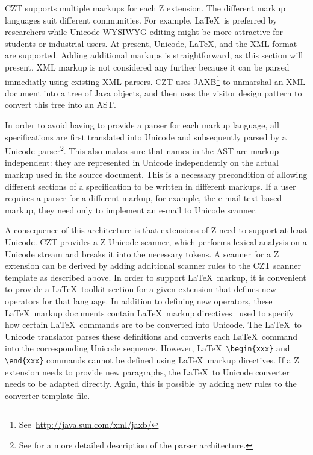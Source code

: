 \documentclass{llncs}
\begin{document}
 CZT supports multiple markups for each Z extension.  The different
 markup languages suit different communities.  For example, \LaTeX\ is
 preferred by researchers while Unicode WYSIWYG editing might be more
 attractive for students or industrial users. At present, Unicode,
 \LaTeX, and the XML format are supported.  Adding additional markups
 is straightforward, as this section will present.  XML markup is not
 considered any further because it can be parsed immediatly using
 existing XML parsers.  CZT uses
 JAXB\footnote{See~\url{http://java.sun.com/xml/jaxb/}} to unmarshal an
 XML document into a tree of Java objects, and then uses the visitor
 design pattern to convert this tree into an AST.

In order to avoid having to provide a parser for each markup language,
all specifications are first translated into Unicode and subsequently
parsed by a Unicode parser\footnote{See \cite{czt} for a more detailed
description of the parser architecture.}.  This also makes sure that
names in the AST are markup independent: they are represented in
Unicode independently on the actual markup used in the source
document.  This is a necessary precondition of allowing different
sections of a specification to be written in different markups.  If a
user requires a parser for a different markup, for example, the e-mail
text-based markup, they need only to implement an e-mail to Unicode
scanner.

A consequence of this architecture is that extensions of Z need
to support at least Unicode.  CZT provides a Z Unicode scanner, which
performs lexical analysis on a Unicode stream and breaks it into the
necessary tokens.  A scanner for a Z extension can be derived by
adding additional scanner rules to the CZT scanner template as
described above.  In order to support \LaTeX\ markup, it is convenient
to provide a \LaTeX\ toolkit section for a given extension that
defines new operators for that language.  In
addition to defining new operators, these \LaTeX\ markup documents
contain \LaTeX\ markup directives~\cite{isoz,czt} used to specify how
certain \LaTeX\ commands are to be converted into Unicode.  The
\LaTeX\ to Unicode translator parses these definitions and converts
each \LaTeX\ command into the corresponding Unicode sequence.
However, \LaTeX\ \verb+\begin{xxx}+ and \verb+\end{xxx}+ commands
cannot be defined using \LaTeX\ markup directives.  If a Z extension
needs to provide new paragraphs, the \LaTeX\ to Unicode converter
needs to be adapted directly.  Again, this is possible by adding new
rules to the converter template file.
\end{document}

